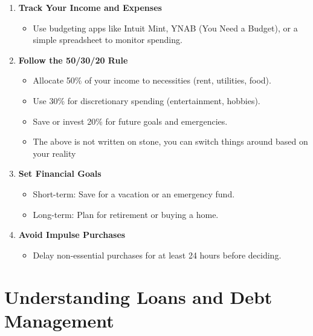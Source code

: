 \documentclass[
  letterpaper,
  DIV=11,
  numbers=noendperiod]{scrreprt}
\providecommand{\tightlist}{%
  \setlength{\itemsep}{0pt}\setlength{\parskip}{0pt}}\usepackage{longtable,booktabs,array}
\begin{document}
\begin{enumerate}
\def\labelenumi{\arabic{enumi}.}
\item
  \textbf{Track Your Income and Expenses}

  \begin{itemize}
  \tightlist
  \item
    Use budgeting apps like Intuit Mint, YNAB (You Need a Budget), or a
    simple spreadsheet to monitor spending.
  \end{itemize}
\item
  \textbf{Follow the 50/30/20 Rule}

  \begin{itemize}
  \tightlist
  \item
    Allocate 50\% of your income to necessities (rent, utilities, food).
  \item
    Use 30\% for discretionary spending (entertainment, hobbies).
  \item
    Save or invest 20\% for future goals and emergencies.
  \item
    The above is not written on stone, you can switch things around
    based on your reality
  \end{itemize}
\item
  \textbf{Set Financial Goals}

  \begin{itemize}
  \tightlist
  \item
    Short-term: Save for a vacation or an emergency fund.
  \item
    Long-term: Plan for retirement or buying a home.
  \end{itemize}
\item
  \textbf{Avoid Impulse Purchases}

  \begin{itemize}
  \tightlist
  \item
    Delay non-essential purchases for at least 24 hours before deciding.
  \end{itemize}
\end{enumerate}

\section{Understanding Loans and Debt
Management}\label{understanding-loans-and-debt-management}
\end{document}
